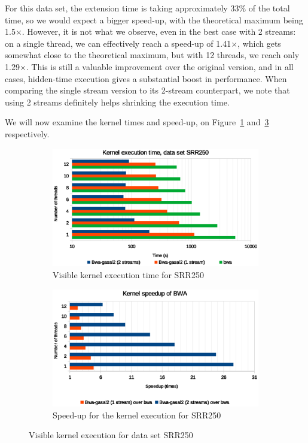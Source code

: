 For this data set, the extension time is taking approximately 33\% of the total time, so we would expect a bigger speed-up, with the theoretical maximum being 1.5$\times$. However, it is not what we observe, even in the best case with 2 streams: on a single thread, we can effectively reach a speed-up of 1.41$\times$, which gets somewhat close to the theoretical maximum, but with 12 threads, we reach only 1.29$\times$. This is still a valuable improvement over the original version, and in all cases, hidden-time execution gives a substantial boost in performance. When comparing the single stream version to its 2-stream counterpart, we note that using 2 streams definitely helps shrinking the execution time.

We will now examine the kernel times and speed-up, on Figure~\ref{fig:kernel-exec-time-srr250} and~\ref{fig:kernel-exec-speed-up-srr250} respectively.


\begin{figure}[p]
	\centering
	\begin{subfigure}[t]{1\textwidth}
		\centering
		\includegraphics[width=1\textwidth]{srr250/kernel-exec-time-srr250}
		\caption{Visible kernel execution time for SRR250}
		\label{fig:kernel-exec-time-srr250}
	\end{subfigure}%
	
	\begin{subfigure}[b]{1\textwidth}
		\centering
		\includegraphics[width=1\textwidth]{srr250/kernel-exec-speed-up-srr250}
		\caption{Speed-up for the kernel execution for SRR250}
		\label{fig:kernel-exec-speed-up-srr250}
	\end{subfigure}
	\caption{Visible kernel execution for data set SRR250}
\end{figure}

